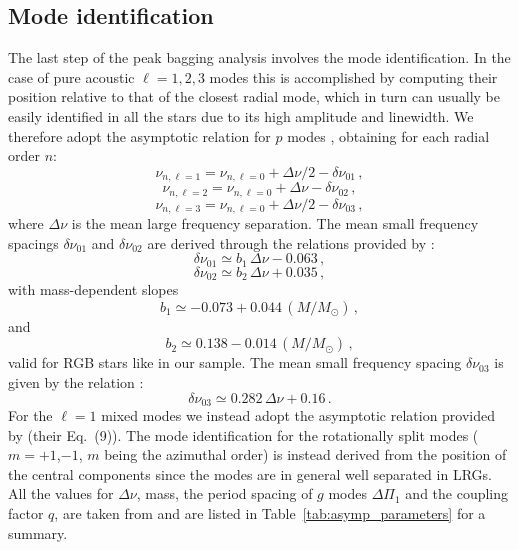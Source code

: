 \documentclass[structabstract]{aa}
\newcommand{\Dnu}{\Delta \nu}
\newcommand{\DP}{\Delta\Pi_1}
\begin{document}
\subsection{Mode identification}
\label{sec:mode_id}
The last step of the peak bagging analysis involves the mode identification. In the case of pure acoustic $\ell = 1,2,3$ modes this is accomplished by computing their position relative to that of the closest radial mode, which in turn can usually be easily identified in all the stars due to its high amplitude and linewidth. We therefore adopt the asymptotic relation for $p$ modes \citep{Vandakurov68,Tassoul80}, obtaining for each radial order $n$:
\begin{equation}
\nu_{n,\ell = 1} = \nu_{n,\ell = 0} + \Dnu/2 - \delta\nu_{01} \, ,
\end{equation} 
\begin{equation}
\nu_{n,\ell = 2} = \nu_{n,\ell = 0} + \Dnu - \delta\nu_{02} \, ,
\end{equation} 
\begin{equation}
\nu_{n,\ell = 3} = \nu_{n,\ell = 0} + \Dnu/2 - \delta\nu_{03} \, ,
\end{equation}
where $\Dnu$ is the mean large frequency separation. The mean small frequency spacings $\delta\nu_{01}$ and $\delta\nu_{02}$ are derived through the relations provided by \cite{Corsaro12}:
\begin{equation}
\delta\nu_{01} \simeq b_1 \,\Delta\nu - 0.063 \, ,
\end{equation}
\begin{equation}
\delta\nu_{02} \simeq b_2 \,\Delta\nu + 0.035 \, ,
\end{equation}
with mass-dependent slopes 
\begin{equation}
b_1 \simeq -0.073 + 0.044 \, \left( M/M_\odot \right) \, ,
\end{equation}
and
\begin{equation}
b_2 \simeq 0.138 - 0.014 \, \left( M/M_\odot \right) \, ,
\end{equation}
valid for RGB stars like in our sample.
The mean small frequency spacing $\delta\nu_{03}$ is given by the relation \citep{Huber10}:
\begin{equation}
\delta\nu_{03} \simeq 0.282 \, \Dnu + 0.16 \, .
\end{equation}
For the $\ell = 1$ mixed modes we instead adopt the asymptotic relation provided by \cite{Mosser12} (their Eq.~(9)). The mode identification for the rotationally split modes ($m = +1$,$-1$, $m$ being the azimuthal order) is instead derived from the position of the central components since the modes are in general well separated in LRGs.   
All the values for $\Dnu$, mass, the period spacing of $g$ modes $\DP$ and the coupling factor $q$, are taken from \cite{Mosser12Cat} and are listed in Table~\ref{tab:asymp_parameters} for a summary.
\end{document}

